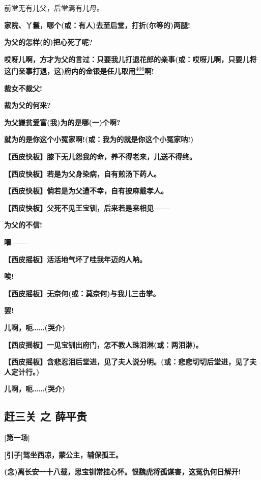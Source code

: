 前堂无有儿父，后堂焉有儿母。

\textbf{家院、丫鬟，哪个(或：有人)去至后堂，打折(尔等的)两腿!}

\textbf{为父的怎样(的)把心死了呢?}

\textbf{哎呀儿啊，方才为父的言过：只要我儿打退花郎的亲事(或：哎呀儿啊，只要儿将这门亲事打退，这)府内的金银是任儿取用}\protect\hyperlink{fn406}{\textsuperscript{406}}\textbf{啊!}

\textbf{裁女不裁父!}

\textbf{裁为父的何来?}

\textbf{为父嫌贫爱富(我)为的是哪(一)个啊?}

\textbf{就为的是你这个小冤家啊!(或：我为的就是你这个小冤家呐!)}

\textbf{【西皮快板】膝下无儿怨我的命，养不得老来，儿送不得终。}

\textbf{【西皮快板】若是为父身染病，自有煎汤下药人。}

\textbf{【西皮快板】倘若是为父遭不幸，自有披麻戴孝人。}

\textbf{【西皮快板】父死不见王宝钏，后来若是来相见------}

\textbf{为父的不信!}

\textbf{嚯------}

\textbf{【西皮摇板】活活地气坏了哇我年迈的人呐。}

\textbf{唉!}

\textbf{【西皮摇板】无奈何(或：莫奈何)与我儿三击掌。}

\textbf{罢!}

\textbf{儿啊，呃\ldots{}\ldots{}(哭介)}

\textbf{【西皮摇板】一见宝钏出府门，怎不教人珠泪淋(或：两泪淋)。}

\textbf{【西皮摇板】含悲忍泪后堂进，见了夫人说分明。(或：悲悲切切后堂进，见了夫人定计行。)}

\textbf{儿啊，呃\ldots{}\ldots{}(哭介)}

\newpage
\hypertarget{ux8d76ux4e09ux5173-ux4e4b-ux859bux5e73ux8d35}{%
\subsection{赶三关 之
薛平贵}\label{ux8d76ux4e09ux5173-ux4e4b-ux859bux5e73ux8d35}}

\textbf{{[}第一场{]}}

\textbf{{[}引子{]}驾坐西凉，蒙公主，辅保孤王。}

\textbf{(念)离长安一十八载，思宝钏常挂心怀。恨魏虎将孤谋害，这冤仇何日解开!}

